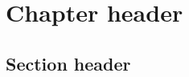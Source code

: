 \documentclass{book}
\begin{document}
\chapter{Chapter header} %
\section{Section header} %

\printindex[aut]
\end{document}
